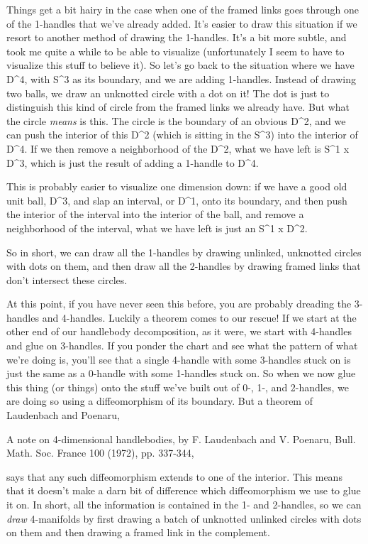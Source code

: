 Things get a bit hairy in the case when one of the framed links goes
through one of the 1-handles that we've already added.  It's easier to
draw this situation if we resort to another method of drawing the 1-handles.
It's a bit more subtle, and took me quite a while to be able to
visualize (unfortunately I seem to have to visualize this stuff to
believe it).  So let's go back to the situation where we have D^4, with
S^3 as its boundary, and we are adding 1-handles.  Instead of drawing
two balls, we draw an unknotted circle with a dot on it!  The dot is
just to distinguish this kind of circle from the framed links we already
have.  But what the circle \emph{means} is this.  The circle is the boundary
of an obvious D^2, and we can push the interior of this D^2 (which
is sitting in the S^3) into the interior of D^4.  If we then remove a
neighborhood of the D^2, what we have left is S^1 x D^3, which is just
the result of adding a 1-handle to D^4.  

This is probably easier to visualize one dimension down: if we have a
good old unit ball, D^3, and slap an interval, or D^1, onto its
boundary, and then push the interior of the interval into the interior
of the ball, and remove a neighborhood of the interval, what we have
left is just an S^1 x D^2.  

So in short, we can draw all the 1-handles by drawing unlinked,
unknotted circles with dots on them, and then draw all the 2-handles by
drawing framed links that don't intersect these circles.  

At this point, if you have never seen this before, you are probably
dreading the 3-handles and 4-handles.  Luckily a theorem comes to our
rescue!  If we start at the other end of our handlebody decomposition,
as it were, we start with 4-handles and glue on 3-handles.  If you
ponder the chart and see what the pattern of what we're doing is, you'll
see that a single 4-handle with some 3-handles stuck on is just the
same as a 0-handle with some 1-handles stuck on.  So when we now glue
this thing (or things) onto the stuff we've built out of 0-, 1-, and
2-handles, we are doing so using a diffeomorphism of its boundary.  But
a theorem of Laudenbach and Poenaru,

A note on 4-dimensional handlebodies, by F. Laudenbach and V. Poenaru,
Bull. Math. Soc. France 100 (1972), pp. 337-344,

says that any such diffeomorphism extends to one of the interior.  This
means that it doesn't make a darn bit of difference which diffeomorphism
we use to glue it on.  In short, all the information is contained in the
1- and 2-handles, so we can \emph{draw} 4-manifolds by first drawing a batch
of unknotted unlinked circles with dots on them and then drawing a
framed link in the complement.  

